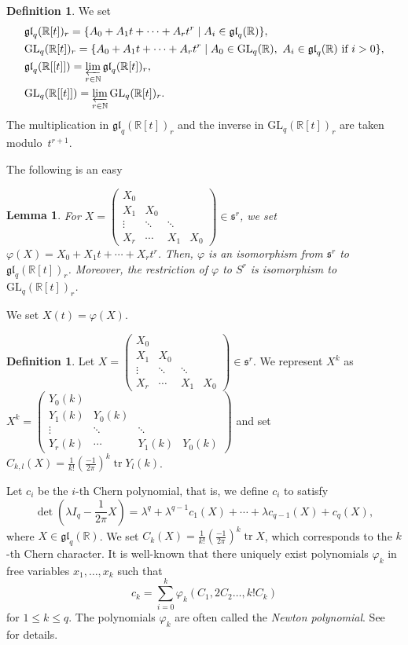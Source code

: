 \documentclass[12pt]{amsart}
\newcommand{\R}{{\mathbb R}}
\newcommand{\N}{{\mathbb N}}
\DeclareMathOperator{\tr}{tr}
\newcommand{\gl}{\mathfrak{gl}}
\newcommand{\GL}{\mathrm{GL}}
\newtheorem{lemma}[theorem]{Lemma}
\theoremstyle{definition}
\newtheorem{definition}[theorem]{Definition}
\theoremstyle{remark}
\begin{document}
\begin{definition}
We set
\begin{align*}
&\gl_q(\R[t])_r=\{A_0+A_1t+\cdots+A_rt^r\mid A_i\in\gl_q(\R)\},\\*
&\GL_q(\R[t])_r=\{A_0+A_1t+\cdots+A_rt^r\mid A_0\in\GL_q(\R),\ A_i\in\gl_q(\R)\text{ if $i>0$}\},\\*
&\gl_q(\R[[t]])=\varprojlim_{r\in\N}\gl_q(\R[t])_r,\\*
&\GL_q(\R[[t]])=\varprojlim_{r\in\N}\GL_q(\R[t])_r.
\end{align*}
The multiplication in $\gl_q(\R[t])_r$ and the inverse in $\GL_q(\R[t])_r$ are taken modulo~$t^{r+1}$.
\end{definition}

The following is an easy

\begin{lemma}
For $X=\begin{pmatrix}
X_0\\
X_1 & X_0\\
\vdots & \ddots & \ddots\\
X_r & \cdots & X_1 &  X_0
\end{pmatrix}
\in\mathfrak{s}^r$, we set $\varphi(X)=X_0+X_1t+\cdots+X_rt^r$.
Then, $\varphi$ is an isomorphism from $\mathfrak{s}^r$ to $\gl_q(\R[t])_r$.
Moreover, the restriction of $\varphi$ to $S^r$ is isomorphism to $\GL_q(\R[t])_r$.
\end{lemma}
We set $X(t)=\varphi(X)$.

\begin{definition}
Let $X=\begin{pmatrix}
X_0\\
X_1 & X_0\\
\vdots & \ddots & \ddots\\
X_r & \cdots & X_1 &  X_0
\end{pmatrix}\in\mathfrak{s}^r$.
We represent $X^k$ as $X^k=\begin{pmatrix}
Y_0(k)\\
Y_1(k) & Y_0(k)\\
\vdots & \ddots & \ddots\\
Y_r(k) & \cdots & Y_1(k) &  Y_0(k)
\end{pmatrix}$ and set $C_{k,l}(X)=\frac1{k!}\left(\frac{-1}{2\pi}\right)^k\tr Y_l(k)$.
\end{definition}

Let $c_i$ be the $i$-th Chern polynomial, that is, we define $c_i$ to satisfy
\[
\det\left(\lambda I_q-\frac1{2\pi}X\right)=\lambda^q+\lambda^{q-1}c_1(X)+\cdots+\lambda c_{q-1}(X)+c_q(X),
\]
where $X\in\gl_q(\R)$.
We set $C_k(X)=\frac1{k!}\left(\frac{-1}{2\pi}\right)^k\tr X$, which corresponds to the $k$-th Chern character.
It is well-known that there uniquely exist polynomials $\varphi_k$ in free variables $x_1,\ldots,x_k$ such that
\[
c_k=\sum_{i=0}^k\varphi_k(C_1,2C_2\ldots,k!C_k)
\]
for $1\leq k\leq q$.
The polynomials $\varphi_k$ are often called the \textit{Newton polynomial}.
See~\cite{Husemoller} for details.
\end{document}
